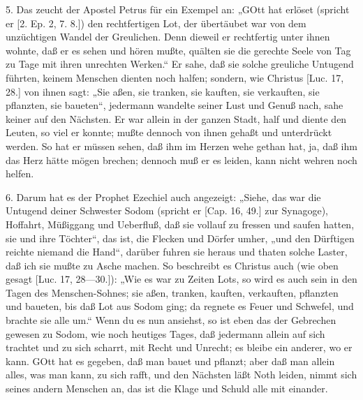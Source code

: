 5. Das zeucht der Apostel Petrus für ein Exempel an: „GOtt hat erlöset (spricht er [2. Ep. 2, 7. 8.]) den rechtfertigen Lot, der übertäubet war von dem unzüchtigen Wandel der Greulichen. Denn dieweil er rechtfertig unter ihnen wohnte, daß er es sehen und hören mußte, quälten sie die gerechte Seele von Tag zu Tage mit ihren unrechten Werken.“ Er sahe, daß sie solche greuliche Untugend führten, keinem Menschen dienten noch halfen; sondern, wie Christus [Luc. 17, 28.] von ihnen sagt: „Sie aßen, sie tranken, sie kauften, sie verkauften, sie pflanzten, sie baueten“, jedermann wandelte seiner Lust und Genuß nach, sahe keiner auf den Nächsten. Er war allein in der ganzen Stadt, half und diente den Leuten, so viel er konnte; mußte dennoch von ihnen gehaßt und unterdrückt werden. So hat er müssen sehen, daß ihm im Herzen wehe gethan hat, ja, daß ihm das Herz hätte mögen brechen; dennoch muß er es leiden, kann nicht wehren noch helfen.

6. Darum hat es der Prophet Ezechiel auch angezeigt: „Siehe, das war die Untugend deiner Schwester Sodom (spricht er [Cap. 16, 49.] zur Synagoge), Hoffahrt, Müßiggang und Ueberfluß, daß sie vollauf zu fressen und saufen hatten, sie und ihre Töchter“, das ist, die Flecken und Dörfer umher, „und den Dürftigen reichte niemand die Hand“, darüber fuhren sie heraus und thaten solche Laster, daß ich sie mußte zu Asche machen. So beschreibt es Christus auch (wie oben gesagt [Luc. 17, 28—30.]): „Wie es war zu Zeiten Lots, so wird es auch sein in den Tagen des Menschen-Sohnes; sie aßen, tranken, kauften, verkauften, pflanzten und baueten, bis daß Lot aus Sodom ging; da regnete es Feuer und Schwefel, und brachte sie alle um.“ Wenn du es nun ansiehst, so ist eben das der Gebrechen gewesen zu Sodom, wie noch heutiges Tages, daß jedermann allein auf sich trachtet und zu sich scharrt, mit Recht und Unrecht; es bleibe ein anderer, wo er kann. GOtt hat es gegeben, daß man bauet und pflanzt; aber daß man allein alles, was man kann, zu sich rafft, und den Nächsten läßt Noth leiden, nimmt sich seines andern Menschen an, das ist die Klage und Schuld alle mit einander.


